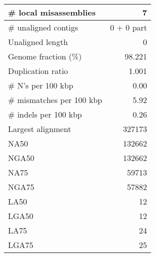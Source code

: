 \documentclass[12pt,a4paper]{article}
\begin{document}
\begin{table}[ht]
\begin{center}
\begin{tabular}{|l*{1}{|r}|}
\# local misassemblies & 7 \\ \hline
\# unaligned contigs & 0 + 0 part \\ \hline
Unaligned length & 0 \\ \hline
Genome fraction (\%) & 98.221 \\ \hline
Duplication ratio & 1.001 \\ \hline
\# N's per 100 kbp & 0.00 \\ \hline
\# mismatches per 100 kbp & 5.92 \\ \hline
\# indels per 100 kbp & 0.26 \\ \hline
Largest alignment & 327173 \\ \hline
NA50 & 132662 \\ \hline
NGA50 & 132662 \\ \hline
NA75 & 59713 \\ \hline
NGA75 & 57882 \\ \hline
LA50 & 12 \\ \hline
LGA50 & 12 \\ \hline
LA75 & 24 \\ \hline
LGA75 & 25 \\ \hline
\end{tabular}
\end{center}
\end{table}
\end{document}

